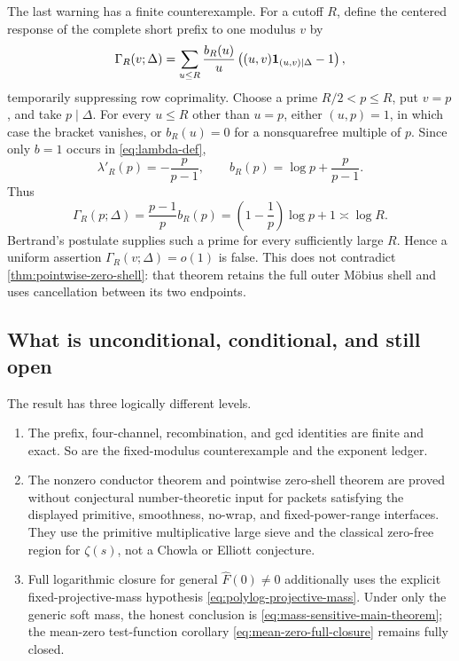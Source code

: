 The last warning has a finite counterexample.  For a cutoff \(R\),
define the centered response of the complete short prefix to one
modulus \(v\) by
\begin{equation}
 \Gamma_R(v;\Delta)=
 \sum_{u\le R}\frac{b_R(u)}u
 \left((u,v)\mathbf 1_{(u,v)\mid\Delta}-1\right),
 \label{eq:fixed-modulus-response}
\end{equation}
temporarily suppressing row coprimality.  Choose a prime
\(R/2<p\le R\), put \(v=p\), and take \(p\mid\Delta\).  For every
\(u\le R\) other than \(u=p\), either \((u,p)=1\), in which case the
bracket vanishes, or \(b_R(u)=0\) for a nonsquarefree multiple of
\(p\).  Since only \(b=1\) occurs in \eqref{eq:lambda-def},
\begin{equation}
 \lambda'_R(p)=-\frac p{p-1},
 \qquad
 b_R(p)=\log p+\frac p{p-1}.
 \label{eq:prime-edge-coefficient}
\end{equation}
Thus
\begin{equation}
 \Gamma_R(p;\Delta)
 =\frac{p-1}{p}b_R(p)
 =\left(1-\frac1p\right)\log p+1
 \asymp\log R.
 \label{eq:fixed-modulus-failure}
\end{equation}
Bertrand's postulate supplies such a prime for every sufficiently
large \(R\).  Hence a uniform assertion
\(\Gamma_R(v;\Delta)=o(1)\) is false.  This does not contradict
\cref{thm:pointwise-zero-shell}: that theorem retains the full outer
M\"obius shell and uses cancellation between its two endpoints.

\subsection{What is unconditional, conditional, and still open}

The result has three logically different levels.

\begin{enumerate}[label=\textup{(\arabic*)}]
 \item The prefix, four-channel, recombination, and gcd identities are
 finite and exact.  So are the fixed-modulus counterexample and the
 exponent ledger.
 \item The nonzero conductor theorem and pointwise zero-shell theorem
 are proved without conjectural number-theoretic input for packets
 satisfying the displayed primitive, smoothness, no-wrap, and
 fixed-power-range interfaces.  They use the primitive
 multiplicative large sieve and the classical zero-free region for
 \(\zeta(s)\), not a Chowla or Elliott conjecture.
 \item Full logarithmic closure for general \(\widehat F(0)\ne0\)
 additionally uses the explicit fixed-projective-mass hypothesis
 \eqref{eq:polylog-projective-mass}.  Under only the generic soft mass,
 the honest conclusion is \eqref{eq:mass-sensitive-main-theorem}; the
 mean-zero test-function corollary
 \eqref{eq:mean-zero-full-closure} remains fully closed.
\end{enumerate}

